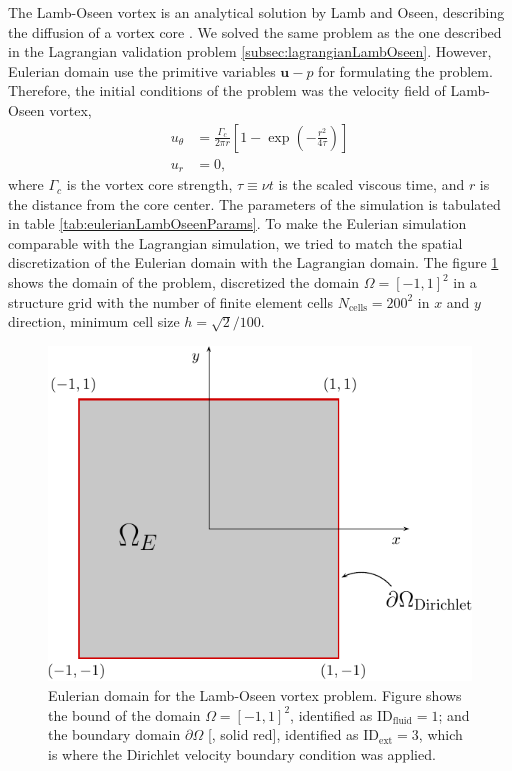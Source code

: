 The Lamb-Oseen vortex is an analytical solution by Lamb and Oseen, describing the diffusion of a vortex core \cite{Tryggeson2007}. We solved the same problem as the one described in the Lagrangian validation problem \ref{subsec:lagrangianLambOseen}. However, Eulerian domain use the primitive variables $\mathbf{u}-p$ for formulating the problem. Therefore, the initial conditions of the problem was the velocity field of Lamb-Oseen vortex,
	\begin{subequations}
	\begin{align}
	u_{\theta} &= \frac{\Gamma_c}{2\pi r} \left[1-\exp\left(-\frac{r^2}{4\tau}\right)\right]\\
	u_r &= 0,
	\end{align}
	\end{subequations}
where $\Gamma_c$ is the vortex core strength, $\tau \equiv \nu t$ is the scaled viscous time, and $r$ is the distance from the core center. The parameters of the simulation is tabulated in table \ref{tab:eulerianLambOseenParams}. To make the Eulerian simulation comparable with the Lagrangian simulation, we tried to match the spatial discretization of the Eulerian domain with the Lagrangian domain. The figure \ref{fig:lambOseenDomainDefinition} shows the domain of the problem, discretized the domain $\Omega = \left[-1,1\right]^2$ in a structure grid with the number of finite element cells $N_{\mathrm{cells}}=200^2$ in $x$ and $y$ direction, minimum cell size $h=\sqrt{2}/100$. 

	\begin{figure}[t]
	\centering
	\includegraphics[width=0.5\linewidth]{./figures/eulerian/lambOseenDomainDefinition-crop.pdf}
	\caption{Eulerian domain for the Lamb-Oseen vortex problem. Figure shows the bound of the domain $\Omega = \left[-1,1\right]^2$, identified as $\mathrm{ID}_{\mathrm{fluid}} = 1$; and the boundary domain $\partial \Omega$ [{\color{plotRed}{---}}, solid red], identified as  $\mathrm{ID}_{\mathrm{ext}} = 3$, which is where the Dirichlet velocity boundary condition was applied.}
	\label{fig:lambOseenDomainDefinition}
	\end{figure}

